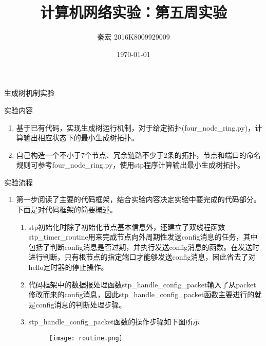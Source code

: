 \documentclass{article} %
\title{计算机网络实验：第五周实验}  %
\author{秦宏 2016K8009929009}   %
\date{\today}       %
\begin{document}
	\maketitle          %
	\begin{section}{生成树机制实验}
		\begin{subsection}{实验内容}
			\begin{enumerate}[1)]
				\item 基于已有代码，实现生成树运行机制，对于给定拓扑(four\_node\_ring.py)，计算输出相应状态下的最小生成树拓扑。
				\item 自己构造一个不小于7个节点、冗余链路不少于2条的拓扑，节点和端口的命名规则可参考four\_node\_ring.py，使用stp程序计算输出最小生成树拓扑。	
			\end{enumerate}
			\end{subsection}
		\begin{subsection}{实验流程}
			\begin{enumerate}[1)]
				\item 第一步阅读了主要的代码框架，结合实验内容决定实验中要完成的代码部分。下面是对代码框架的简要概述。
					\begin{enumerate}[(1)]
						\item stp初始化时除了初始化节点基本信息外，还建立了双线程函数stp\_timer\_routine用来完成节点向外周期性发送config消息的任务，其中包括了判断config消息是否过期，并执行发送config消息的函数。在发送时进行判断，只有根节点的指定端口才能够发送config消息，因此省去了对hello定时器的停止操作。
						\item 代码框架中的数据报处理函数stp\_handle\_config\_packet输入了从packet修改而来的config消息，因此stp\_handle\_config\_packet函数主要进行的就是config消息的判断处理步骤。
						\item							stp\_handle\_config\_packet函数的操作步骤如下图所示\\
						\begin{figure}[!b]	
							\centering
							\texttt{[image: routine.png]}	
						\end{figure}
 

\end{enumerate}
\end{enumerate}
\end{subsection}
\end{section}
\end{document}
